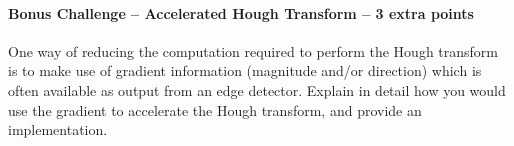 \documentclass[a4paper]{article}
\begin{document}
\paragraph{Bonus Challenge -- Accelerated Hough Transform -- 3 extra points} One way of reducing the
computation required to perform the Hough transform is to make use of gradient
information (magnitude and/or direction) which is often available as output from
an edge detector.  Explain in detail how you would use the gradient to
accelerate the Hough transform, and provide an implementation.





\end{document}

